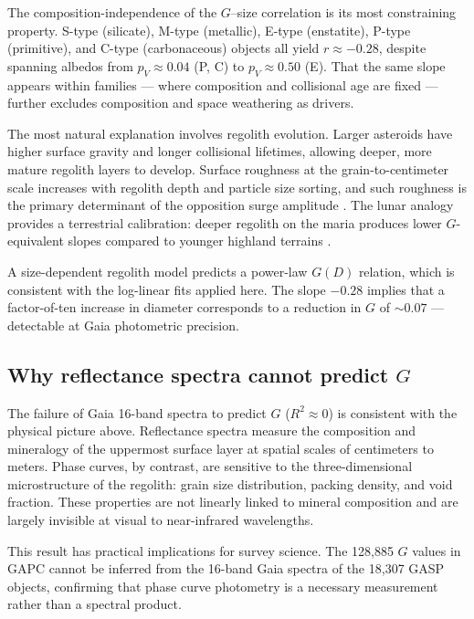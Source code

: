 \documentclass{aa}
\newcommand{\gapc}{GAPC\xspace}
\begin{document}
The composition-independence of the $G$–size correlation is its most
constraining property.  S-type (silicate), M-type (metallic), E-type
(enstatite), P-type (primitive), and C-type (carbonaceous) objects all
yield $r \approx -0.28$, despite spanning albedos from $p_V \approx 0.04$
(P, C) to $p_V \approx 0.50$ (E).  That the same slope appears within
families — where composition and collisional age are fixed — further
excludes composition and space weathering as drivers.

The most natural explanation involves regolith evolution.  Larger asteroids
have higher surface gravity and longer collisional lifetimes, allowing
deeper, more mature regolith layers to develop.  Surface roughness at the
grain-to-centimeter scale increases with regolith depth and particle size
sorting, and such roughness is the primary determinant of the opposition
surge amplitude \citep{hapke1981, shkuratov2004}.  The lunar analogy
provides a terrestrial calibration: deeper regolith on the maria produces
lower $G$-equivalent slopes compared to younger highland terrains
\citep{akimov1988}.

A size-dependent regolith model predicts a power-law $G(D)$ relation, which
is consistent with the log-linear fits applied here.  The slope $-0.28$
implies that a factor-of-ten increase in diameter corresponds to a reduction
in $G$ of $\sim 0.07$ — detectable at Gaia photometric precision.

\subsection{Why reflectance spectra cannot predict \texorpdfstring{$G$}{G}}
\label{sec:discuss_spectra}

The failure of Gaia 16-band spectra to predict $G$ ($R^2 \approx 0$)
is consistent with the physical picture above.  Reflectance spectra
measure the composition and mineralogy of the uppermost surface layer at
spatial scales of centimeters to meters.  Phase curves, by contrast, are
sensitive to the three-dimensional microstructure of the regolith: grain
size distribution, packing density, and void fraction.  These properties
are not linearly linked to mineral composition and are largely invisible at
visual to near-infrared wavelengths.

This result has practical implications for survey science.  The 128,885
$G$ values in \gapc cannot be inferred from the 16-band Gaia spectra
of the 18,307 GASP objects, confirming that phase curve photometry is
a necessary measurement rather than a spectral product.
\end{document}
